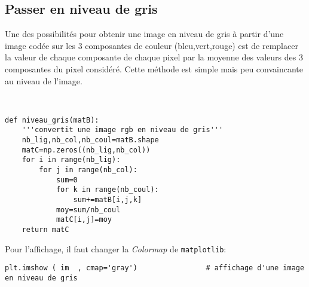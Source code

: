 %


\subsection{Passer en niveau de gris}
\begin{minipage}{6cm}
 Une des possibilités pour obtenir une image en niveau de gris à partir 
d'une image codée sur les 3
composantes de couleur (bleu,vert,rouge) est de remplacer la valeur
de chaque composante de chaque
pixel par la moyenne des valeurs des 3 composantes du pixel considéré.
Cette méthode est simple mais peu convaincante au niveau de l'image.
\end{minipage} \ \ \
\begin{minipage}{11cm}
\begin{lstlisting}
def niveau_gris(matB):
    '''convertit une image rgb en niveau de gris'''
    nb_lig,nb_col,nb_coul=matB.shape
    matC=np.zeros((nb_lig,nb_col))
    for i in range(nb_lig):
        for j in range(nb_col):
            sum=0
            for k in range(nb_coul):
                sum+=matB[i,j,k]
            moy=sum/nb_coul
            matC[i,j]=moy
    return matC  
\end{lstlisting}
\end{minipage}

Pour l'affichage, il faut changer la \textit{Colormap} de \texttt{matplotlib}:
\begin{lstlisting}
plt.imshow ( im  , cmap='gray')                # affichage d'une image en niveau de gris
\end{lstlisting}

